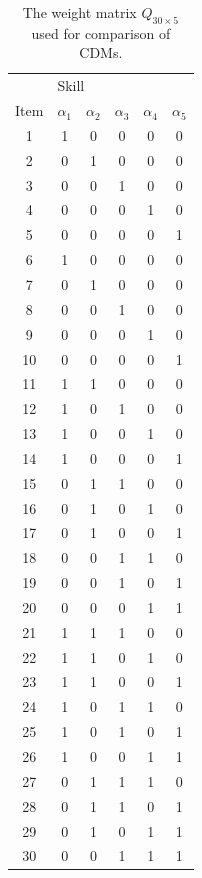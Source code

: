 \documentclass[english]{pwr_wmat_praca_dyplomowa}
\theoremstyle{plain}
\numberwithin{theorem}{chapter}
\theoremstyle{definition}
\numberwithin{theorem}{chapter}
\begin{document}
	\begin{table}[H]
		\centering
		\begin{tabular}{c c c c c c} 
			\hline
			{\rule{0pt}{3ex}} & \multicolumn{5}{l}{Skill} \\
			Item & $\alpha_1$ & $\alpha_2$ & $\alpha_3$ &  $\alpha_4$ & $\alpha_5$ \\ [0.5ex] 
			\hline
			1 & 1 & 0 & 0 & 0 & 0 \\ 
			2 & 0 & 1 & 0 & 0 & 0 \\
			3 & 0 & 0 & 1 & 0 & 0 \\
			4 & 0 & 0 & 0 & 1 & 0 \\
			5 & 0 & 0 & 0 & 0 & 1 \\
			6 & 1 & 0 & 0 & 0 & 0 \\ 
			7 & 0 & 1 & 0 & 0 & 0 \\
			8 & 0 & 0 & 1 & 0 & 0 \\
			9 & 0 & 0 & 0 & 1 & 0 \\
			10 & 0 & 0 & 0 & 0 & 1 \\ 
			11 & 1 & 1 & 0 & 0 & 0 \\ 
			12 & 1 & 0 & 1 & 0 & 0 \\
			13 & 1 & 0 & 0 & 1 & 0 \\
			14 & 1 & 0 & 0 & 0 & 1 \\
			15 & 0 & 1 & 1 & 0 & 0 \\
			16 & 0 & 1 & 0 & 1 & 0 \\  
			17 & 0 & 1 & 0 & 0 & 1 \\ 
			18 & 0 & 0 & 1 & 1 & 0 \\
			19 & 0 & 0 & 1 & 0 & 1 \\
			20 & 0 & 0 & 0 & 1 & 1 \\ 
			21 & 1 & 1 & 1 & 0 & 0 \\
			22 & 1 & 1 & 0 & 1 & 0 \\ 
			23 & 1 & 1 & 0 & 0 & 1 \\ 
			24 & 1 & 0 & 1 & 1 & 0 \\
			25 & 1 & 0 & 1 & 0 & 1 \\ 
			26 & 1 & 0 & 0 & 1 & 1 \\ 
			27 & 0 & 1 & 1 & 1 & 0 \\ 
			28 & 0 & 1 & 1 & 0 & 1 \\ 
			29 & 0 & 1 & 0 & 1 & 1 \\ 
			30 & 0 & 0 & 1 & 1 & 1\\ [1ex] 
			\hline
		\end{tabular}
		\caption{The weight matrix $Q_{30 \times 5}$ used for comparison of CDMs.}
		\label{tab:qmatrix_sim} 
	\end{table}
	
\end{document}
